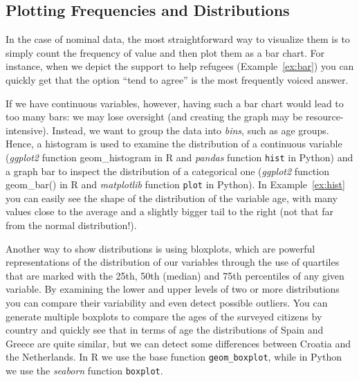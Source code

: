 \subsection{Plotting Frequencies and Distributions}
In the case of nominal data, the most straightforward way to visualize them is to simply count the frequency of value and then plot them as a bar chart. For instance, when we depict the support to help refugees (Example~\ref{ex:bar}) you can quickly get that the option ``tend to agree'' is the most frequently voiced answer.


If we have continuous variables, however, having such a bar chart would lead to too many bars: we may lose oversight (and creating the graph may be resource-intensive). Instead, we want to group the data into \emph{bins}, such as age groups.
Hence, a histogram is used to examine the distribution of a continuous variable (\emph{ggplot2} function geom\_histogram in R and \emph{pandas} function \texttt{hist} in Python) and a graph bar to inspect the distribution of a categorical one (\emph{ggplot2} function geom\_bar() in R and \emph{matplotlib} function \texttt{plot} in Python). In Example~\ref{ex:hist} you can easily see the shape of the distribution of the variable age, with many values close to the average and a slightly bigger tail to the right (not that far from the normal distribution!).


Another way to show distributions is using bloxplots, which are powerful representations of the distribution of our variables through the use of quartiles that are marked with the 25th, 50th (median) and 75th percentiles of any given variable. By examining the lower and upper levels of two or more distributions you can compare their variability and even detect possible outliers. You can generate multiple boxplots to compare the ages of the surveyed citizens by country and quickly see that in terms of age the distributions of Spain and Greece are quite similar, but we can detect some differences between Croatia and the Netherlands. In R we use the base function \texttt{geom\_boxplot}, while in Python we use the \emph{seaborn} function \texttt{boxplot}.





